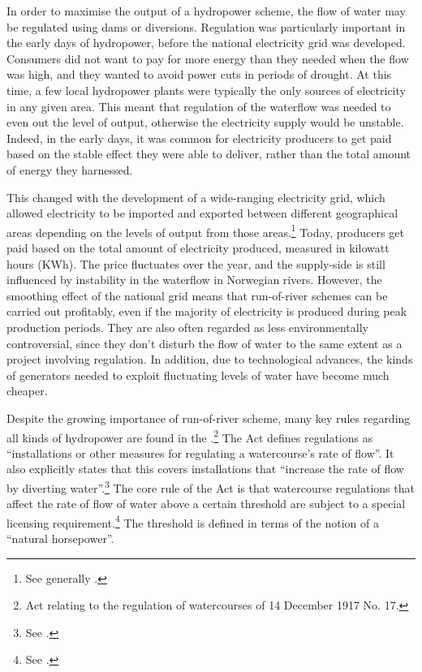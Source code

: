 In order to maximise the output of a hydropower scheme, the flow of water may be regulated using dams or diversions. Regulation was particularly important in the early days of hydropower, before the national electricity grid was developed. Consumers did not want to pay for more energy than they needed when the flow was high, and they wanted to avoid power cuts in periods of drought. At this time, a few local hydropower plants were typically the only sources of electricity in any given area. This meant that regulation of the waterflow was needed to even out the level of output, otherwise the electricity supply would be unstable. Indeed, in the early days, it was common for electricity producers to get paid based on the stable effect they were able to deliver, rather than the total amount of energy they harnessed.

This changed with the development of a wide-ranging electricity grid, which allowed electricity to be imported and exported between different geographical areas depending on the levels of output from those areas.\footnote{See generally \cite{sofienlund07}.} Today, producers get paid based on the total amount of electricity produced, measured in kilowatt hours (KWh). The price fluctuates over the year, and the supply-side is still influenced by instability in the waterflow in Norwegian rivers. However, the smoothing effect of the national grid means that run-of-river schemes can be carried out profitably, even if the majority of electricity is produced during peak production periods. They are also often regarded as less environmentally controversial, since they don't disturb the flow of water to the same extent as a project involving regulation. In addition, due to technological advances, the kinds of generators needed to exploit fluctuating levels of water have become much cheaper. 

Despite the growing importance of run-of-river scheme, many key rules regarding all kinds of hydropower are found in the \cite{wra17}.\footnote{Act relating to the regulation of watercourses of 14 December 1917 No. 17.} The Act defines regulations as ``installations or other measures for regulating a watercourse's rate of flow''. It also explicitly states that this covers installations that ``increase the rate of flow by diverting water''.\footnote{See \cite[1]{wra17}.} The core rule of the Act is that watercourse regulations that affect the rate of flow of water above a certain threshold are subject to a special licensing requirement.\footnote{See \cite[2]{wra17}.} The threshold is defined in terms of the notion of a ``natural horsepower''. 

